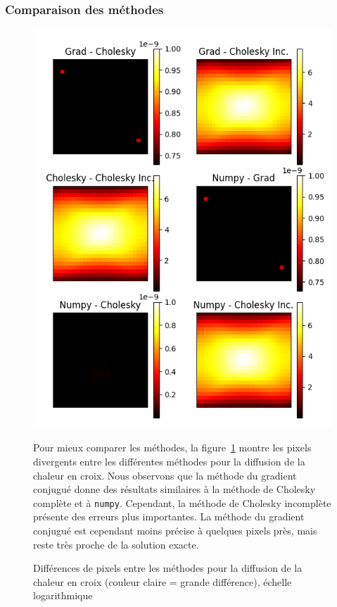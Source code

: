 \documentclass{article}
\begin{document}
\subsubsection{Comparaison des méthodes}
\begin{figure}[H]
  \begin{minipage}{0.3\textwidth}
      \includegraphics[width=\textwidth]{img/chaleur.png}
      \caption{Différences de pixels entre les méthodes pour la diffusion de la chaleur en croix (couleur claire = grande différence), échelle logarithmique}
      \label{fig:chaleur}
  \end{minipage}
  \hfill
  \begin{minipage}{0.65\textwidth}
    Pour mieux comparer les méthodes, la figure~\ref{fig:chaleur} montre les pixels divergents entre les différentes méthodes pour la diffusion de la chaleur en croix. Nous observons que la méthode du gradient conjugué donne des résultats similaires à la méthode de Cholesky complète et à \texttt{numpy}. Cependant, la méthode de Cholesky incomplète présente des erreurs plus importantes. La méthode du gradient conjugué est cependant moins précise à quelques pixels près, mais reste très proche de la solution exacte.

\end{minipage}
\end{figure}
\end{document}
